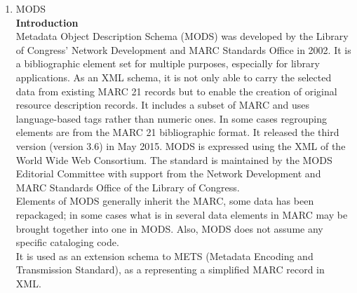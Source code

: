 \begin{enumerate}
	\item MODS\\
	{\bf Introduction}\\
	Metadata Object Description Schema (MODS) was developed by the Library of Congress' Network Development and MARC Standards Office in 2002. It is a bibliographic element set for multiple purposes, especially for library applications. As an XML schema, it is not only able to carry the selected data from existing MARC 21 records but to enable the creation of original resource description records. It includes a subset of MARC and uses language-based tags rather than numeric ones. In some cases regrouping elements are from the MARC 21 bibliographic format. It released the third version (version 3.6) in May 2015. MODS is expressed using the XML of the World Wide Web Consortium. The standard is maintained by the MODS Editorial Committee with support from the Network Development and MARC Standards Office of the Library of Congress.\\
	
	Elements of MODS generally inherit the MARC, some data has been repackaged; in some cases what is in several data elements in MARC may be brought together into one in MODS. Also, MODS does not assume any specific cataloging code.\\ It is used as an extension schema to METS (Metadata Encoding and Transmission Standard), as a representing a simplified MARC record in XML.
	

\end{enumerate}
